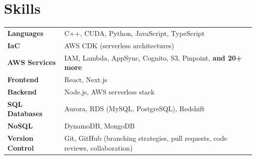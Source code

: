 \documentclass[a4paper,12pt]{article}
\begin{document}
\section{Skills}
\begin{tabularx}{\linewidth}{@{}l X@{}}
\textbf{Languages} & C++, CUDA, Python, JavaScript, TypeScript \\
\textbf{IaC} & AWS CDK (serverless architectures) \\
\textbf{AWS Services} & IAM, Lambda, AppSync, Cognito, S3, Pinpoint, \textbf{and 20+ more} \\
\textbf{Frontend} & React, Next.js \\
\textbf{Backend} & Node.js, AWS serverless stack \\
\textbf{SQL Databases} & Aurora, RDS (MySQL, PostgreSQL), Redshift \\
\textbf{NoSQL} & DynamoDB, MongoDB \\
\textbf{Version Control} & Git, GitHub (branching strategies, pull requests, code reviews, collaboration) \\
\end{tabularx}


\end{document}

